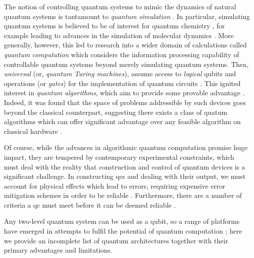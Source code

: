 \par 
The notion of controlling quantum systems to mimic the dynamics of natural quantum systems is tantamount to 
    \emph{quantum simulation} \cite{lloyd1996universal, cirac2012goals}. 
In particular, simulating quantum systems is believed to be of interest for quantum chemistry \cite{cao2019quantum, lanyon2010towards, mcardle2020quantum}, 
    for example leading to advances in the simulation of molecular dynamics \cite{aspuru2005simulated, sparrow2018simulating}.
More generally, however, this led to research into a wider domain of calculations called \emph{quantum computation}
    which considers the information processing capability of controllable quantum systems beyond merely simulating quantum systems. 
Then, \emph{universal } (or, \emph{quantum Turing machines}), 
    assume access to \emph{logical} qubits and operations (or \emph{gates}) for the implementation of quantum circuits \cite{deutsch1985quantum}. 
This ignited interest in \emph{quantum algorithms}, which aim to provide some provable advantage 
    \cite{grover1997quantum, simon1997power, bennett1997strengths, bernstein1997quantum, shor1999polynomial}.
Indeed, it was found that the space of problems addressible by such devices
    goes beyond the classical counterpart,
    suggesting there exists a class of quatum algorithms which can offer significant advantage over 
    any feasible algorithm on classical hardware \cite{watrous2008quantum}. 
\par 

Of course, while the advances in algorithmic quantum computation promise huge impact, 
    they are tempered by contemporary experimental constraints, 
    which must deal with the reality that construction and control of 
    quantum devices is a significant challenge.
In constructing \glspl{qc} and dealing with their output, 
    we must account for physical effects which lead to errors, 
    requiring expensive error mitigation schemes in order to be reliable \cite{shor1996fault, aharonov2008fault}.
Furthermore, there are a number of criteria a \gls{qc} must meet before it can be deemed reliable \cite{divincenzo2000physical}. 
\par 

Any two-level quantum system can be used as a qubit, so a range of platforms have emerged in
    attempts to fulfil the potential of quantum computation \cite{humble2019quantum};
    here we provide an incomplete list of quantum architectures together with their primary advantages and limitations.

